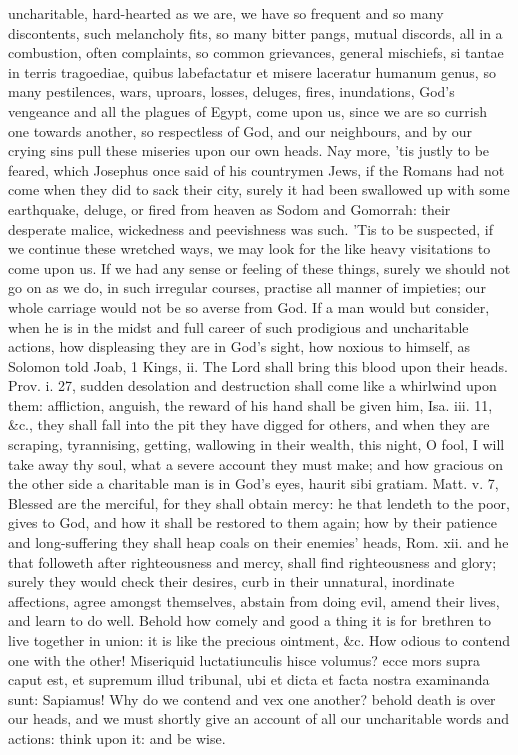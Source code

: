 {uncharitable, hard-hearted as we are, we have so frequent and so many
discontents, such melancholy fits, so many bitter pangs, mutual
discords, all in a combustion, often complaints, so common grievances,
general mischiefs, si tantae in terris tragoediae, quibus labefactatur
et misere laceratur humanum genus, so many pestilences, wars, uproars,
losses, deluges, fires, inundations, God's vengeance and all the
plagues of Egypt, come upon us, since we are so currish one towards
another, so respectless of God, and our neighbours, and by our crying
sins pull these miseries upon our own heads. Nay more, 'tis justly to
be feared, which Josephus once said of his countrymen Jews, if
the Romans had not come when they did to sack their city, surely it had
been swallowed up with some earthquake, deluge, or fired from heaven as
Sodom and Gomorrah: their desperate malice, wickedness and peevishness
was such. 'Tis to be suspected, if we continue these wretched ways, we
may look for the like heavy visitations to come upon us. If we had any
sense or feeling of these things, surely we should not go on as we do,
in such irregular courses, practise all manner of impieties; our whole
carriage would not be so averse from God. If a man would but consider,
when he is in the midst and full career of such prodigious and
uncharitable actions, how displeasing they are in God's sight, how
noxious to himself, as Solomon told Joab, 1 Kings, ii. The Lord shall
bring this blood upon their heads. Prov. i. 27, sudden desolation and
destruction shall come like a whirlwind upon them: affliction, anguish,
the reward of his hand shall be given him, Isa. iii. 11, \&c., they
shall fall into the pit they have digged for others, and when they are
scraping, tyrannising, getting, wallowing in their wealth, this night,
O fool, I will take away thy soul, what a severe account they must
make; and how gracious on the other side a charitable man is in
God's eyes, haurit sibi gratiam. Matt. v. 7, Blessed are the merciful,
for they shall obtain mercy: he that lendeth to the poor, gives to God,
and how it shall be restored to them again; how by their patience and
long-suffering they shall heap coals on their enemies' heads, Rom. xii.
and he that followeth after righteousness and mercy, shall find
righteousness and glory; surely they would check their desires, curb in
their unnatural, inordinate affections, agree amongst themselves,
abstain from doing evil, amend their lives, and learn to do well.
Behold how comely and good a thing it is for brethren to live together
in union: it is like the precious ointment, \&c. How odious to
contend one with the other!  Miseriquid luctatiunculis hisce
volumus? ecce mors supra caput est, et supremum illud tribunal, ubi et
dicta et facta nostra examinanda sunt: Sapiamus! Why do we contend and
vex one another? behold death is over our heads, and we must shortly
give an account of all our uncharitable words and actions: think upon
it: and be wise.
}

